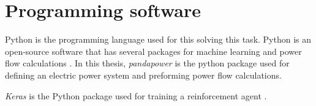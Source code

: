 \documentclass[class=book, crop=false]{standalone}
\begin{document}
\section{Programming software}
Python is the programming language used for this solving this task. Python is an open-source software that has several packages for machine learning and power flow calculations \cite{python_web}. In this thesis, \textit{pandapower} is the python package used for defining an electric power system and preforming power flow calculations\cite{pandapower}.

\textit{Keras} is the Python package used for training a reinforcement agent \cite{keras_chollet2015}.
\end{document}
